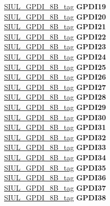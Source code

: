 \begin{DoxyCompactItemize}
\begin{tabbing}
\>\>\mbox{\hyperlink{unionSIUL__GPDI__8B__tag}{SIUL\_GPDI\_8B\_tag}} {\bfseries GPDI19}\\
\>\>\mbox{\hyperlink{unionSIUL__GPDI__8B__tag}{SIUL\_GPDI\_8B\_tag}} {\bfseries GPDI20}\\
\>\>\mbox{\hyperlink{unionSIUL__GPDI__8B__tag}{SIUL\_GPDI\_8B\_tag}} {\bfseries GPDI21}\\
\>\>\mbox{\hyperlink{unionSIUL__GPDI__8B__tag}{SIUL\_GPDI\_8B\_tag}} {\bfseries GPDI22}\\
\>\>\mbox{\hyperlink{unionSIUL__GPDI__8B__tag}{SIUL\_GPDI\_8B\_tag}} {\bfseries GPDI23}\\
\>\>\mbox{\hyperlink{unionSIUL__GPDI__8B__tag}{SIUL\_GPDI\_8B\_tag}} {\bfseries GPDI24}\\
\>\>\mbox{\hyperlink{unionSIUL__GPDI__8B__tag}{SIUL\_GPDI\_8B\_tag}} {\bfseries GPDI25}\\
\>\>\mbox{\hyperlink{unionSIUL__GPDI__8B__tag}{SIUL\_GPDI\_8B\_tag}} {\bfseries GPDI26}\\
\>\>\mbox{\hyperlink{unionSIUL__GPDI__8B__tag}{SIUL\_GPDI\_8B\_tag}} {\bfseries GPDI27}\\
\>\>\mbox{\hyperlink{unionSIUL__GPDI__8B__tag}{SIUL\_GPDI\_8B\_tag}} {\bfseries GPDI28}\\
\>\>\mbox{\hyperlink{unionSIUL__GPDI__8B__tag}{SIUL\_GPDI\_8B\_tag}} {\bfseries GPDI29}\\
\>\>\mbox{\hyperlink{unionSIUL__GPDI__8B__tag}{SIUL\_GPDI\_8B\_tag}} {\bfseries GPDI30}\\
\>\>\mbox{\hyperlink{unionSIUL__GPDI__8B__tag}{SIUL\_GPDI\_8B\_tag}} {\bfseries GPDI31}\\
\>\>\mbox{\hyperlink{unionSIUL__GPDI__8B__tag}{SIUL\_GPDI\_8B\_tag}} {\bfseries GPDI32}\\
\>\>\mbox{\hyperlink{unionSIUL__GPDI__8B__tag}{SIUL\_GPDI\_8B\_tag}} {\bfseries GPDI33}\\
\>\>\mbox{\hyperlink{unionSIUL__GPDI__8B__tag}{SIUL\_GPDI\_8B\_tag}} {\bfseries GPDI34}\\
\>\>\mbox{\hyperlink{unionSIUL__GPDI__8B__tag}{SIUL\_GPDI\_8B\_tag}} {\bfseries GPDI35}\\
\>\>\mbox{\hyperlink{unionSIUL__GPDI__8B__tag}{SIUL\_GPDI\_8B\_tag}} {\bfseries GPDI36}\\
\>\>\mbox{\hyperlink{unionSIUL__GPDI__8B__tag}{SIUL\_GPDI\_8B\_tag}} {\bfseries GPDI37}\\
\>\>\mbox{\hyperlink{unionSIUL__GPDI__8B__tag}{SIUL\_GPDI\_8B\_tag}} {\bfseries GPDI38}\\

\end{tabbing}
\end{DoxyCompactItemize}
